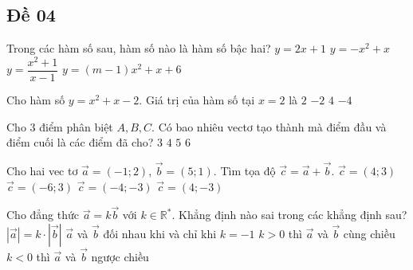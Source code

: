 \subsection{Đề 04}
\caulc
\begin{ex}%
    Trong các hàm số sau, hàm số nào là hàm số bậc hai?
    \choice
    {$y=2x+1$}
    {\True $y=-x^2+x$}
    {$y=\dfrac{x^2+1}{x-1}$}
    {$y=(m-1)x^2+x+6$}
\end{ex}
\begin{ex}%
    Cho hàm số $y=x^2+x-2$. Giá trị của hàm số tại $x=2$ là
    \choice
    {$2$}
    {$-2$}
    {\True $4$}
    {$-4$}
\end{ex}
\begin{ex}%
    Cho $3$ điểm phân biệt $A, B, C$. Có bao nhiêu vectơ tạo thành mà điểm đầu và điểm cuối là các điểm đã cho?
    \choice
    {$3$}
    {$4$}
    {$5$}
    {\True $6$}
\end{ex}
\begin{ex}%
    Cho hai vec tơ $\overrightarrow{a}=(-1; 2)$, $\overrightarrow{b}=(5;1)$. Tìm tọa độ $\overrightarrow{c}=\overrightarrow{a}+\overrightarrow{b}$.
    \choice
    {\True $\overrightarrow{c}=(4; 3)$}
    {$\overrightarrow{c}=(-6; 3)$}
    {$\overrightarrow{c}=(-4; -3)$}
    {$\overrightarrow{c}=(4; -3)$}
\end{ex}
\begin{ex}%
    Cho đẳng thức $\overrightarrow{a}=k\overrightarrow{b}$ với $k\in \mathbb{R}^*$. Khẳng định nào sai trong các khẳng định sau?
    \choice
    {\True $\left|\overrightarrow{a}\right|=k\cdot \left|\overrightarrow{b}\right|$}
    {$\overrightarrow{a}$ và $\overrightarrow{b}$ đối nhau khi và chỉ khi $k=-1$}
    {$k>0$ thì $\overrightarrow{a}$ và $\overrightarrow{b}$ cùng chiều}
    {$k<0$ thì $\overrightarrow{a}$ và $\overrightarrow{b}$ ngược chiều}
\end{ex}
